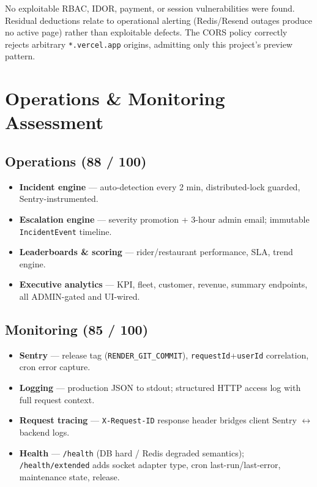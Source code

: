\documentclass[11pt,a4paper]{article}
\begin{document}
\begin{tcolorbox}[colback=ok!6,colframe=ok,title=\textbf{Security Verdict: 92 / 100}]
No exploitable RBAC, IDOR, payment, or session vulnerabilities were found.
Residual deductions relate to operational alerting (Redis/Resend outages produce
no active page) rather than exploitable defects.  The CORS policy correctly
rejects arbitrary \texttt{*.vercel.app} origins, admitting only this project's
preview pattern.
\end{tcolorbox}

\newpage

\section{Operations \& Monitoring Assessment}

\subsection{Operations (88 / 100)}
\begin{itemize}[leftmargin=1.4em,nosep]
  \item \textbf{Incident engine} — auto-detection every 2 min, distributed-lock guarded, Sentry-instrumented.
  \item \textbf{Escalation engine} — severity promotion + 3-hour admin email; immutable \texttt{IncidentEvent} timeline.
  \item \textbf{Leaderboards \& scoring} — rider/restaurant performance, SLA, trend engine.
  \item \textbf{Executive analytics} — KPI, fleet, customer, revenue, summary endpoints, all ADMIN-gated and UI-wired.
\end{itemize}

\subsection{Monitoring (85 / 100)}
\begin{itemize}[leftmargin=1.4em,nosep]
  \item \textbf{Sentry} — release tag (\texttt{RENDER\_GIT\_COMMIT}), \texttt{requestId}+\texttt{userId} correlation, cron error capture.
  \item \textbf{Logging} — production JSON to stdout; structured HTTP access log with full request context.
  \item \textbf{Request tracing} — \texttt{X-Request-ID} response header bridges client Sentry $\leftrightarrow$ backend logs.
  \item \textbf{Health} — \texttt{/health} (DB hard / Redis degraded semantics); \texttt{/health/extended} adds socket adapter type, cron last-run/last-error, maintenance state, release.
\end{itemize}
\end{document}

